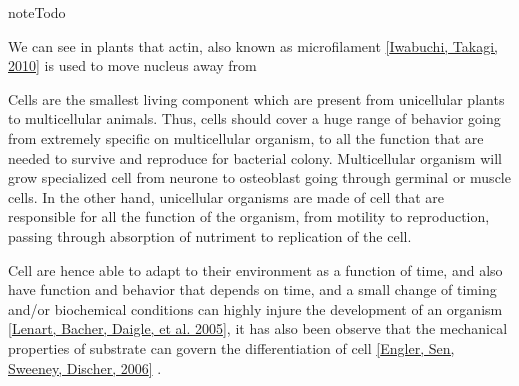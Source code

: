 \documentclass[A4paperpaper,11pt,english]{sphinxmanual}
\begin{document}
\begin{notice}{note}{Todo}

We can see in plants that actin, also known as microfilament
{\hyperref[bibitem:iwabuchi2010]{{[}Iwabuchi, Takagi,  2010{]}}} is used to move nucleus away from
\end{notice}

Cells are the smallest living component which are present from unicellular
plants to multicellular animals. Thus, cells should cover a huge range of
behavior going from extremely specific on multicellular organism, to all the
function that are needed to survive and reproduce for bacterial colony.
Multicellular organism will grow specialized cell from neurone to osteoblast
going through germinal or muscle cells. In the other hand, unicellular
organisms are made of cell that are responsible for all the function of the
organism, from motility to reproduction, passing through absorption of
nutriment to replication of the cell.

Cell are hence able to adapt to their environment as a function of time, and
also have function and behavior that depends on time, and a small change of
timing and/or biochemical conditions can highly injure the development of an
organism {\hyperref[bibitem:lenart2005]{{[}Lenart, Bacher, Daigle,  et al.  2005{]}}}, it has also been observe that the mechanical
properties of substrate can govern the differentiation of cell
{\hyperref[bibitem:engler2006]{{[}Engler, Sen, Sweeney, Discher,  2006{]}}} .
\end{document}
